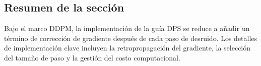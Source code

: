 \subsection{Resumen de la sección}

Bajo el marco DDPM, la implementación de la guía DPS se reduce a añadir un término de corrección de gradiente después de cada paso de desruido. Los detalles de implementación clave incluyen la retropropagación del gradiente, la selección del tamaño de paso y la gestión del costo computacional.

